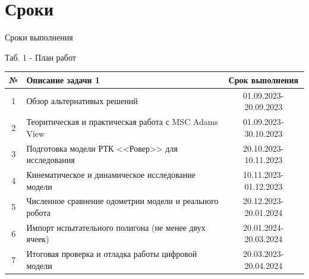 \documentclass[12pt, aspectratio=169]{beamer}
\begin{document}
    \section{Сроки}
    \begin{frame}{Сроки выполнения}\relax
      \vspace{-1.5cm}
      \begin{flushright}
        Таб. 1 - План работ
      \end{flushright}
      \vspace{-0.5cm}
      \resizebox {15cm}{!}
      {
      \begin{tabular}{c l c}
        \hline 
        № & Описание задачи 1 & Срок выполнения \\
         \hline
          1 & Обзор альтернативых решений & 01.09.2023-20.09.2023 \\ \hline
          2 & Теоритическая и практическая работа с MSC Adams View & 01.09.2023-30.10.2023 \\ \hline
          3 & Подготовка модели РТК <<Ровер>> для исследования & 20.10.2023-10.11.2023 \\ \hline
          4 & Кинематическое и динамическое исследование модели & 10.11.2023-01.12.2023 \\ \hline
          5 & Численное сравнение одометрии модели и реального робота & 20.12.2023-20.01.2024 \\ \hline
          6 & Импорт испытательного полигона (не менее двух ячеек) & 20.01.2024-20.03.2024 \\ \hline
          7 & Итоговая проверка и отладка работы цифровой модели & 20.03.2023-20.04.2024 \\ \hline
        \end{tabular}
      }
    \end{frame}
\end{document}
